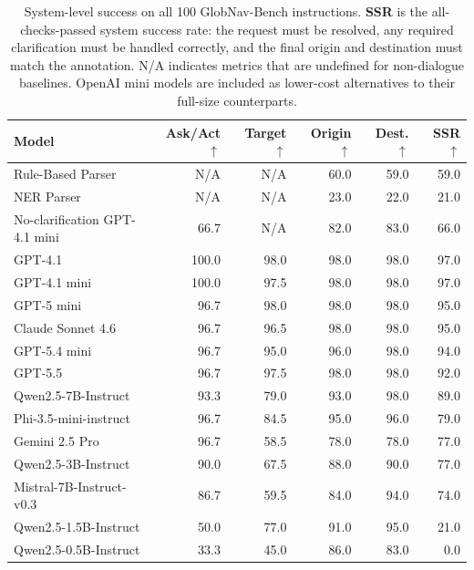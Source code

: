 \documentclass[11pt]{article}
\newcommand{\bench}{GlobNav-Bench\xspace}
\begin{document}
\begin{table}[ht]
\centering
\small
\setlength{\tabcolsep}{6pt}
\begin{tabular*}{\textwidth}{@{\extracolsep{\fill}}lrrrrr@{}}
\toprule
\textbf{Model} & \textbf{Ask/Act} $\uparrow$ & \textbf{Target} $\uparrow$ & \textbf{Origin} $\uparrow$ & \textbf{Dest.} $\uparrow$ & \textbf{SSR} $\uparrow$ \\
\midrule
Rule-Based Parser & \textsc{N/A} & \textsc{N/A} & 60.0 & 59.0 & 59.0 \\
NER Parser & \textsc{N/A} & \textsc{N/A} & 23.0 & 22.0 & 21.0 \\
No-clarification GPT-4.1 mini & 66.7 & \textsc{N/A} & 82.0 & 83.0 & 66.0 \\
\midrule
GPT-4.1 & 100.0 & 98.0 & 98.0 & 98.0 & 97.0 \\
GPT-4.1 mini & 100.0 & 97.5 & 98.0 & 98.0 & 97.0 \\
GPT-5 mini & 96.7 & 98.0 & 98.0 & 98.0 & 95.0 \\
Claude Sonnet 4.6 & 96.7 & 96.5 & 98.0 & 98.0 & 95.0 \\
GPT-5.4 mini & 96.7 & 95.0 & 96.0 & 98.0 & 94.0 \\
GPT-5.5 & 96.7 & 97.5 & 98.0 & 98.0 & 92.0 \\
Qwen2.5-7B-Instruct & 93.3 & 79.0 & 93.0 & 98.0 & 89.0 \\
Phi-3.5-mini-instruct & 96.7 & 84.5 & 95.0 & 96.0 & 79.0 \\
Gemini 2.5 Pro & 96.7 & 58.5 & 78.0 & 78.0 & 77.0 \\
Qwen2.5-3B-Instruct & 90.0 & 67.5 & 88.0 & 90.0 & 77.0 \\
Mistral-7B-Instruct-v0.3 & 86.7 & 59.5 & 84.0 & 94.0 & 74.0 \\
Qwen2.5-1.5B-Instruct & 50.0 & 77.0 & 91.0 & 95.0 & 21.0 \\
Qwen2.5-0.5B-Instruct & 33.3 & 45.0 & 86.0 & 83.0 & 0.0 \\
\bottomrule
\end{tabular*}
\caption{System-level success on all 100 \bench instructions. \textbf{SSR} is the all-checks-passed system success rate: the request must be resolved, any required clarification must be handled correctly, and the final origin and destination must match the annotation. \textsc{N/A} indicates metrics that are undefined for non-dialogue baselines. OpenAI mini models are included as lower-cost alternatives to their full-size counterparts.}
\label{tab:system}
\end{table}
\end{document}
